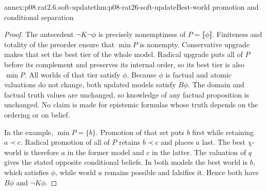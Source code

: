 \begin{annexitem}{annex:p08.rat2.6.soft-update}{thm:p08-rat26-soft-update}{Best-world promotion and conditional separation}
\begin{proof}
The antecedent \(\neg K\neg\phi\) is precisely nonemptiness of
\(P=\llbracket\phi\rrbracket\). Finiteness and totality of the
preorder ensure that \(\min P\) is nonempty. Conservative upgrade
makes that set the best tier of the whole model. Radical upgrade puts
all of \(P\) before its complement and preserves its internal order,
so its best tier is also \(\min P\). All worlds of that tier satisfy
\(\phi\). Because \(\phi\) is factual and atomic valuations do
not change, both updated models satisfy \(B\phi\). The domain and
factual truth values are unchanged, so knowledge of any factual
proposition is unchanged. No claim is made for epistemic formulas
whose truth depends on the ordering or on belief.

In the example, \(\min P=\{b\}\). Promotion of that set puts
\(b\) first while retaining \(a\prec c\). Radical promotion of
all of \(P\) retains \(b\prec c\) and places \(a\) last.
The best \(\chi\)-world is therefore \(a\) in the former model
and \(c\) in the latter. The valuation of \(q\) gives the stated
opposite conditional beliefs. In both models the best world is \(b\),
which satisfies \(\phi\), while world \(a\) remains possible and
falsifies it. Hence both have \(B\phi\) and \(\neg K\phi\).
\end{proof}
\end{annexitem}

